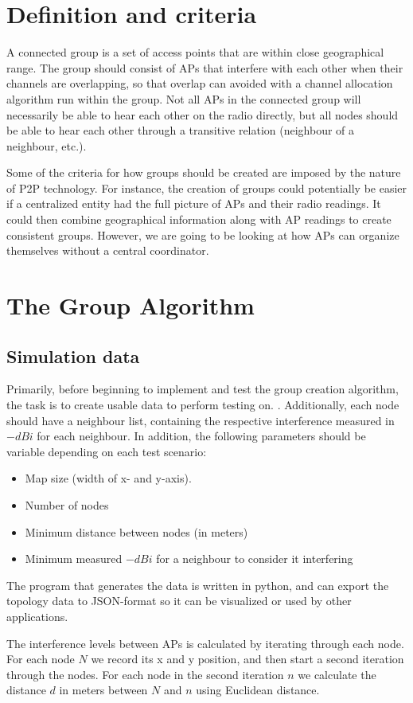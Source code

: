 \documentclass[a4paper,UKenglish]{report}
\begin{document}
\section{Definition and criteria}
A connected group is a set of access points that are within close geographical range. The group should consist of APs that
interfere with each other when their channels are overlapping, so that overlap can avoided with a channel allocation algorithm run within the group.
Not all APs in the connected group will necessarily be able to hear each other on the radio directly,
but all nodes should be able to hear each other through a transitive relation (neighbour of a neighbour, etc.).

Some of the criteria for how groups should be created are imposed by the nature of P2P technology. For instance, the creation of groups could potentially
be easier if a centralized entity had the full picture of APs and their radio readings. It could then combine geographical information along with
AP readings to create consistent groups. However, we are going to be looking at how APs can organize themselves without a central coordinator.


\section{The Group Algorithm} 


\subsection{Simulation data}
Primarily, before beginning to implement and test the group creation algorithm, the task
is to create usable data to perform testing on. . Additionally, each node should have a neighbour list,
containing the respective interference measured in $-dBi$ for each neighbour. In addition,
the following parameters should be variable depending on each test scenario:

\begin{itemize}
\item Map size (width of x- and y-axis).
\item Number of nodes
\item Minimum distance between nodes (in meters)
\item Minimum measured $-dBi$ for a neighbour to consider it interfering
\end{itemize}

The program that generates the data is written in python, and can export the topology data to
JSON-format so it can be visualized or used by other applications.

The interference levels between APs is calculated by iterating through each node.
For each node $N$ we record its x and y position, and then start a second iteration through the nodes.
For each node in the second iteration $n$ we calculate the distance $d$ in
meters between $N$ and $n$ using Euclidean distance.



\printbibliography
\end{document}

